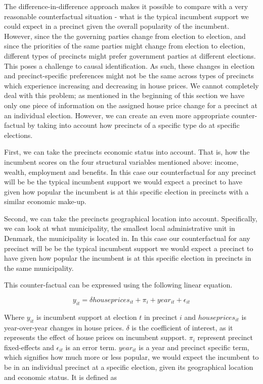 \documentclass[12pt,a4paper]{article}
\begin{document}
The difference-in-difference approach makes it possible to compare with a very reasonable counterfactual situation - what is the typical incumbent support we could expect in a precinct given the overall popularity of the incumbent. However, since the the governing parties change from election to election, and since the priorities of the same parties might change from election to election, different types of precincts might prefer government parties at  different elections. This poses a challenge to causal identification. As such,  these changes in election and precinct-specific preferences might not be the same across types of precincts which experience increasing and decreasing in house prices. We cannot completely deal with this problem; as mentioned in the beginning of this section we have only one piece of information on the assigned house price change for a precinct at an individual election. However, we can create an even more appropriate counter-factual by taking into account how precincts of a specific type do at specific elections.

First, we can take the precincts economic status into account. That is, how the incumbent scores on the four structural variables mentioned above: income, wealth, employment and benefits. In this case our counterfactual for any precinct will be be the typical incumbent support we would expect a precinct to have given how popular the incumbent is at this specific election in precincts with a similar economic make-up.

Second, we can take the precincts geographical location into account. Specifically, we can look at what municipality,  the smallest local administrative unit in Denmark, the municipality is located in. In this case our counterfactual for any precinct will be be the typical incumbent support we would expect a precinct to have given how popular the incumbent is at this specific election in precincts in the same municipality.

This counter-factual can be expressed using the following linear equation.

\begin{equation}
y_{it}= \delta houseprices_{it} + \pi_i + year_{it} + \epsilon_{it}
\end{equation}

Where $y_{it}$ is incumbent support at election $t$ in precinct $i$ and $houseprices_{it}$ is year-over-year changes in house prices. $\delta$ is the coefficient of interest, as it represents the effect of house prices on incumbent support.  $\pi_i$ represent precinct fixed-effects and $\epsilon_{it}$ is an error term. $year_{it}$ is a year and precinct specific term, which signifies how much more or less popular, we would expect the incumbent to be in an individual precinct at a specific election, given its geographical location and economic status. It is defined as
\end{document}
